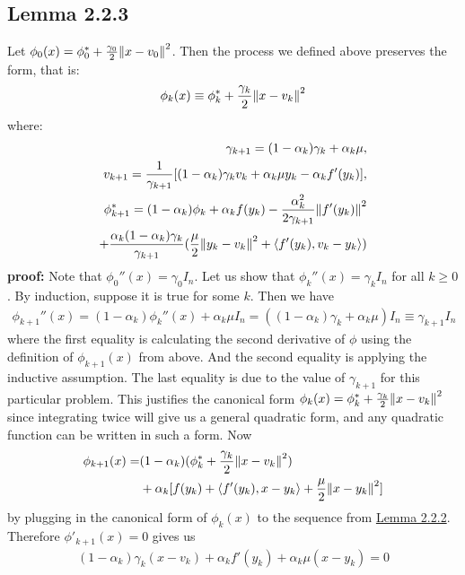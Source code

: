 \documentclass[12pt,a4paper]{article}
\begin{document}
	 \subsection*{Lemma 2.2.3}\label{lem223}
	 Let $\phi_0(x) = \phi_0^* + \frac{\gamma_0}{2}\norm{x - v_0}^2$. Then the process we defined above preserves the form, that is:
	 \begin{align*}
	 \phi_k(x) \equiv \phi_k^* + \frac{\gamma_k}{2}\norm{x - v_k}^2
	 \end{align*}
	 where:
	 \begin{align*}
	 	\gamma_{k+1} = (1 - \alpha_k)\gamma_k + \alpha_k \mu, \\
	 	v_{k+1} = \frac{1}{\gamma_{k+1}}[(1-\alpha_k)\gamma_kv_k + \alpha_k\mu y_k - \alpha_kf'(y_k)], \\
	 	\phi_{k+1}^* = (1 - \alpha_k)\phi_k + \alpha_kf(y_k) - \frac{\alpha_k^2}{2\gamma_{k+1}}\norm{f'(y_k)}^2 \\
	 	+ \frac{\alpha_k(1 - \alpha_k)\gamma_k}{\gamma_{k+1}}(\frac{\mu}{2}\norm{y_k - v_k}^2 + \langle f'(y_k), v_k - y_k \rangle)
	 \end{align*}
	 \textbf{proof:} Note that $\phi_0''(x) = \gamma_0I_n$. Let us show that $\phi_k''(x) = \gamma_kI_n$ for all $k \geq 0$. By induction, suppose it is true for some $k$. Then we have
	 \begin{align*}
	 	\phi_{k+1}''(x) = (1 - \alpha_k)\phi_k''(x) + \alpha_k\mu I_n = ((1 - \alpha_k)\gamma_k + \alpha_k \mu)I_n \equiv \gamma_{k+1}I_n
	 \end{align*}
	 where the first equality is calculating the second derivative of $\phi$ using the definition of $\phi_{k+1}(x)$ from above. And the second equality is applying the inductive assumption. The last equality is due to the value of $\gamma_{k+1}$ for this particular problem. This justifies the canonical form $\phi_k(x) = \phi_k^* + \frac{\gamma_k}{2}\norm{x - v_k}^2$ since integrating twice will give us a general quadratic form, and any quadratic function can be written in such a form. Now
	 \begin{align*}
	 	\phi_{k+1}(x) = &(1 - \alpha_k)(\phi_k^* + \frac{\gamma_k}{2}\norm{x - v_k}^2) \\
	 	&+ \alpha_k[f(y_k) + \langle f'(y_k), x - y_k \rangle + \frac{\mu}{2}\norm{x - y_k}^2]
	 \end{align*}
	 by plugging in the canonical form of $\phi_k(x)$ to the sequence from \hyperref[lem222]{Lemma 2.2.2}. Therefore $\phi'_{k+1}(x) = 0$ gives us
	 \begin{align*}
	 	(1 - \alpha_k)\gamma_k(x - v_k) + \alpha_kf'(y_k) + \alpha_k\mu(x - y_k) = 0
	 \end{align*}
\end{document}
